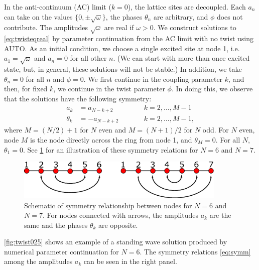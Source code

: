 \documentclass[12pt,reqno]{amsart}
\def\noi{\noindent}
\begin{document}
In the anti-continuum (AC) limit ($k = 0$), the lattice sites are decoupled. Each $a_n$ can take on the values $\{0, \pm \sqrt{\omega} \}$, the phases $\theta_n$ are arbitrary, and $\phi$ does not contribute. The amplitudes $\sqrt{\omega}$ are real if  $\omega > 0$. We construct solutions to \cref{eq:twisteqreal} by parameter continuation from the AC limit with no twist using AUTO. As an initial condition, we choose a single excited site at node 1, i.e. $a_1 = \sqrt{\omega}$ and $a_n = 0$ for all other $n$. (We can start with more than once excited state, but, in general, these solutions will not be stable.) In addition, we take $\theta_n = 0$ for all $n$ and $\phi = 0$.  We first continue in the coupling parameter $k$, and then, for fixed $k$, we continue in the twist parameter $\phi$. In doing this, we observe that the solutions have the following symmetry:
\begin{equation}\label{eq:symm}
\begin{aligned}
a_k &= a_{N-k+2} && \qquad k = 2, \dots, M-1 \\
\theta_k &= -a_{N-k+2} && \qquad k = 2, \dots, M-1,
\end{aligned}
\end{equation}
where $M = (N/2)+1$ for $N$ even and $M = (N+1)/2$ for $N$ odd. For $N$ even, node $M$ is the node directly across the ring from node 1, and $\theta_M = 0$. For all $N$, $\theta_1 = 0$. See \cref{fig:symmetry1} for an illustration of these symmetry relations for $N = 6$ and $N = 7$. 
\begin{figure}[H]
\begin{center}
\includegraphics[width=10cm]{symmetry1.eps}
\end{center}
\caption{Schematic of symmetry relationship between nodes for $N = 6$ and $N=7$. For nodes connected with arrows, the amplitudes $a_k$ are the same and the phases $\theta_k$ are opposite.}
\label{fig:symmetry1}
\end{figure}
\noi \cref{fig:twist025} shows an example of a standing wave solution produced by numerical parameter continuation for $N = 6$. The symmetry relations \cref{eq:symm} among the amplitudes $a_k$ can be seen in the right panel.
\end{document}
